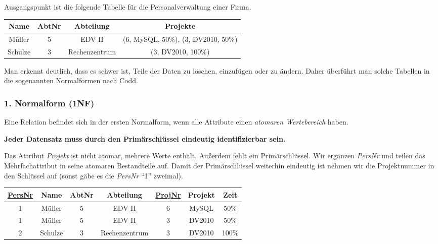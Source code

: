 \documentclass[9pt,a4paper]{arbeitsblatt}
\begin{document}
\ReiheTitel

Ausgangspunkt ist die folgende Tabelle für die Personalverwaltung einer Firma.

\begin{center}
\begin{tabular}{|c|c|c|c|}\hline
	\rowcolor{ab.tabelle.kopf.hg} Name & AbtNr & Abteilung & Projekte \\\hline
	Müller & 5 & EDV II & (6, MySQL, 50\%), (3, DV2010, 50\%) \\\hline
	Schulze & 3 & Rechenzentrum & (3, DV2010, 100\%) \\\hline
\end{tabular}
\end{center}

Man erkennt deutlich, dass es schwer ist, Teile der Daten zu löschen, einzufügen oder zu ändern. Daher überführt man solche Tabellen in die sogenannten Normalformen nach Codd.

\begin{infobox}\vspace*{-1em}
	\subsubsection*{1. Normalform (1NF)}
	
	Eine Relation befindet sich in der ersten Normalform, wenn alle Attribute einen 
	\emph{atomaren Wertebereich} haben.
	
	\textbf{Jeder Datensatz muss durch den Primärschlüssel eindeutig identifizierbar sein.}
\end{infobox}

Das Attribut \emph{Projekt} ist nicht atomar, mehrere Werte enthält. Außerdem fehlt ein Primärschlüssel. Wir ergänzen \emph{PersNr} und teilen das Mehrfachattribut in seine atomaren Bestandteile auf. Damit der Primärschlüssel weiterhin
eindeutig ist nehmen wir die Projektnummer in den Schlüssel auf (sonst gäbe es die \emph{PersNr} \enquote{1} zweimal).

\begin{center}
\begin{tabular}{|c|c|c|c|c|c|c|}\hline
	\rowcolor{ab.tabelle.kopf.hg} \underline{PersNr} & Name & AbtNr & Abteilung & \underline{ProjNr} & Projekt & Zeit \\\hline
	1 & Müller & 5 & EDV II & 6 & MySQL & 50\% \\\hline
	1 & Müller & 5 & EDV II & 3 & DV2010 & 50\% \\\hline
	2 & Schulze & 3 & Rechenzentrum & 3 & DV2010 & 100\% \\\hline
\end{tabular}
\end{center}
\end{document}
